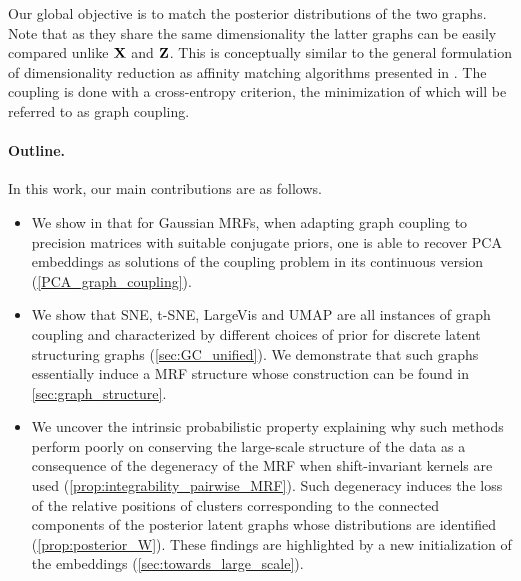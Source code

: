 Our global objective is to match the posterior distributions of the two graphs. Note that as they share the same dimensionality the latter graphs can be easily compared unlike $\mathbf{X}$ and $\mathbf{Z}$. This is conceptually similar to the general formulation of dimensionality reduction as affinity matching algorithms presented in . The coupling is done with a cross-entropy criterion, the minimization of which will be referred to as graph coupling.

\paragraph{Outline.} 

In this work, our main contributions are as follows.

\begin{itemize}
    \item We show in  that for Gaussian MRFs, when adapting graph coupling to precision matrices with suitable conjugate priors, one is able to recover PCA embeddings as solutions of the coupling problem in its continuous version (\cref{PCA_graph_coupling}).
    \item We show that SNE, t-SNE, LargeVis and UMAP are all instances of graph coupling and characterized by different choices of prior for discrete latent structuring graphs (\cref{sec:GC_unified}). We demonstrate that such graphs essentially induce a MRF structure whose construction can be found in \cref{sec:graph_structure}.
    \item We uncover the intrinsic probabilistic property explaining why such methods perform poorly on conserving the large-scale structure of the data as a consequence of the degeneracy of the MRF when shift-invariant kernels are used (\cref{prop:integrability_pairwise_MRF}). Such degeneracy induces the loss of the relative positions of clusters corresponding to the connected components of the posterior latent graphs whose distributions are identified (\cref{prop:posterior_W}). These findings are highlighted by a new initialization of the embeddings (\cref{sec:towards_large_scale}).
\end{itemize}
